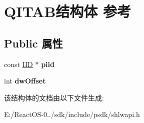 \hypertarget{struct_q_i_t_a_b}{}\section{Q\+I\+T\+A\+B结构体 参考}
\label{struct_q_i_t_a_b}
\subsection*{Public 属性}
\begin{DoxyCompactItemize}
\item 
\mbox{\label{struct_q_i_t_a_b_a6d05c3c5cba7c2313ce5ed043a43a4d3}} 
const \hyperlink{struct___i_i_d}{I\+ID} $\ast$ {\bfseries piid}
\item 
\mbox{\label{struct_q_i_t_a_b_a65124c3e2b372f1d26974a1757412928}} 
int {\bfseries dw\+Offset}
\end{DoxyCompactItemize}


该结构体的文档由以下文件生成\+:\begin{DoxyCompactItemize}
\item 
E\+:/\+React\+O\+S-\/0../sdk/include/psdk/shlwapi.\+h\end{DoxyCompactItemize}
